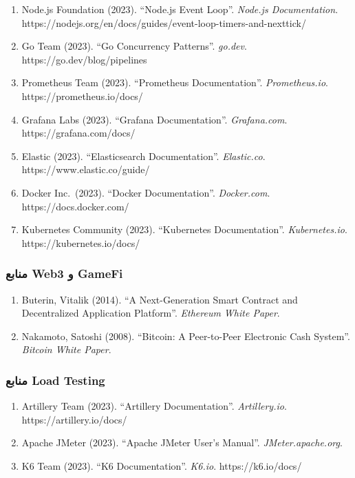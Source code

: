 \documentclass[
]{article}
\begin{document}
\begin{enumerate}
\def\labelenumi{\arabic{enumi}.}
\setcounter{enumi}{20}
\item
  Node.js Foundation (2023). ``Node.js Event Loop''. \emph{Node.js
  Documentation}.
  https://nodejs.org/en/docs/guides/event-loop-timers-and-nexttick/
\item
  Go Team (2023). ``Go Concurrency Patterns''. \emph{go.dev}.
  https://go.dev/blog/pipelines
\item
  Prometheus Team (2023). ``Prometheus Documentation''.
  \emph{Prometheus.io}. https://prometheus.io/docs/
\item
  Grafana Labs (2023). ``Grafana Documentation''. \emph{Grafana.com}.
  https://grafana.com/docs/
\item
  Elastic (2023). ``Elasticsearch Documentation''. \emph{Elastic.co}.
  https://www.elastic.co/guide/
\item
  Docker Inc.~(2023). ``Docker Documentation''. \emph{Docker.com}.
  https://docs.docker.com/
\item
  Kubernetes Community (2023). ``Kubernetes Documentation''.
  \emph{Kubernetes.io}. https://kubernetes.io/docs/
\end{enumerate}

\subsubsection{منابع Web3 و
GameFi}\label{ux645ux646ux627ux628ux639-web3-ux648-gamefi}

\begin{enumerate}
\def\labelenumi{\arabic{enumi}.}
\setcounter{enumi}{27}
\item
  Buterin, Vitalik (2014). ``A Next-Generation Smart Contract and
  Decentralized Application Platform''. \emph{Ethereum White Paper}.
\item
  Nakamoto, Satoshi (2008). ``Bitcoin: A Peer-to-Peer Electronic Cash
  System''. \emph{Bitcoin White Paper}.
\end{enumerate}

\subsubsection{منابع Load
Testing}\label{ux645ux646ux627ux628ux639-load-testing}

\begin{enumerate}
\def\labelenumi{\arabic{enumi}.}
\setcounter{enumi}{29}
\item
  Artillery Team (2023). ``Artillery Documentation''.
  \emph{Artillery.io}. https://artillery.io/docs/
\item
  Apache JMeter (2023). ``Apache JMeter User's Manual''.
  \emph{JMeter.apache.org}.
\item
  K6 Team (2023). ``K6 Documentation''. \emph{K6.io}.
  https://k6.io/docs/
\end{enumerate}
\end{document}
